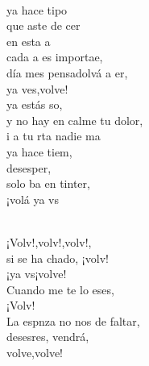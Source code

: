 \documentclass[12pt]{article}
\begin{document}
\begin{multicols*}{2}
\begin{cancion}
\begin{chorus}
	\end{chorus}%
	\jump\\
	ya hace tipo\\
	que aste de cer\\
	 en esta a \\
	cada a es importae,\\
	día mes pensadolvá a er,\\
	ya ves,volve!\\
\jump
	ya estás so,\\
	y no hay en calme tu dolor,\\
	i a tu rta nadie ma \\
	ya hace tiem,\\
	desesper, \\
	solo ba en tinter,\\
	¡volá ya vs\\\jump\\
	\begin{chorus}%
	¡Volv!,volv!,volv!,     \\
	si se ha chado, ¡volv!\\
	¡ya vs¡volve!\\
	Cuando me te lo eses,\\
	¡Volv!\\
\jump
	La espnza no nos  de faltar,\\
	desesres, vendrá,\\
	volve,volve!\\
	\end{chorus}%
	\jump\\
\end{cancion}%


\end{multicols*}
\end{document}
